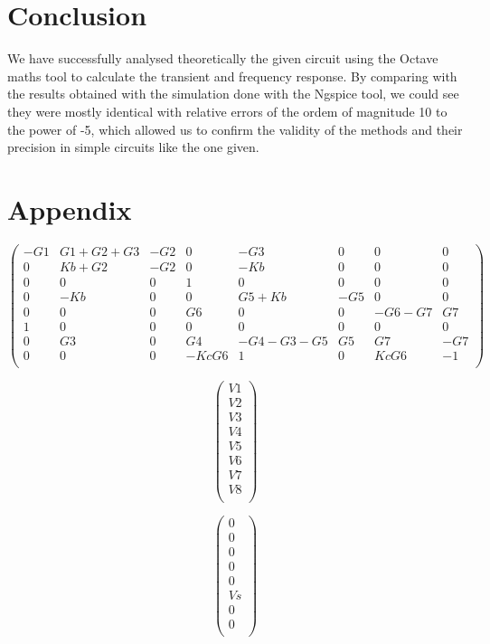 \pagebreak
\section{Conclusion}
\label{sec:conclusion}

We have successfully analysed theoretically the given circuit using the Octave maths tool to calculate the transient and frequency response. By comparing with the results obtained with the simulation done with the Ngspice tool, we could see they were mostly  identical with relative errors of the ordem of magnitude 10 to the power of -5, which allowed us to confirm the validity of the methods and their precision in simple circuits like the one given.
 
\pagebreak
\section{Appendix}
\begin{equation}
\begin{pmatrix}
    -G1 & G1+G2+G3 & -G2 & 0 & -G3 & 0 & 0 & 0 \\
    0 & Kb+G2 & -G2 & 0 & -Kb & 0 & 0 & 0 \\
    0 & 0 & 0 & 1 & 0 & 0 & 0 & 0 \\
    0 & -Kb & 0 & 0 & G5+Kb & -G5 & 0 & 0 \\
    0 & 0 & 0 & G6 & 0 & 0 & -G6-G7 & G7 \\
    1 & 0 & 0 & 0 & 0 & 0 & 0 & 0 \\
    0 & G3 & 0 & G4 & -G4-G3-G5 & G5 & G7 & -G7 \\
    0 & 0 & 0 & -KcG6 & 1 & 0 & KcG6 & -1\\
    
\end{pmatrix}
\end{equation}

\begin{equation}
\begin{pmatrix}
  V1 \\
  V2 \\
  V3 \\
  V4 \\
  V5 \\
  V6 \\
  V7 \\
  V8 \\
 
\end{pmatrix}
\end{equation}

\begin{equation}
\begin{pmatrix} 
  0 \\
  0 \\
  0 \\
  0 \\
  0 \\
  Vs \\
  0 \\
  0 \\
\end{pmatrix}
\end{equation}

